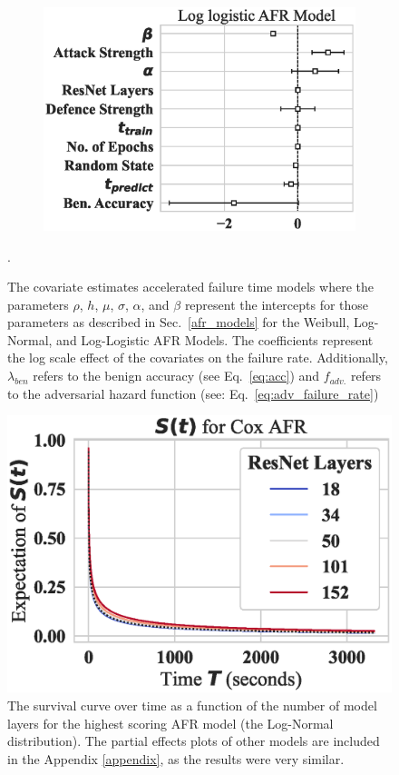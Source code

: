 \begin{figure}
\begin{subfigure}{0.32\textwidth}
        \includegraphics[width=\textwidth]{cifar100/log_logistic_aft.eps}
    \end{subfigure}
    
    \caption{The covariate estimates accelerated failure time models where the parameters $\rho$, $h$, $\mu$, $\sigma$, $\alpha$, and $\beta$ represent the intercepts for those parameters as described in Sec.~\ref{afr_models} for the Weibull, Log-Normal, and Log-Logistic AFR Models. The coefficients represent the log scale effect of the covariates on the failure rate. Additionally, $\lambda_{ben}$ refers to the benign accuracy (see Eq.~\ref{eq:acc}) and $f_{adv.}$ refers to the adversarial hazard function (see: Eq.~\ref{eq:adv_failure_rate})}.
    \label{fig:afr_models}
\end{figure}

% 
\begin{figure}
    \centering\includegraphics[width=.5\textwidth]{cifar100/log_normal_layers_partial_effect.eps}
   \caption{The survival curve over time as a function of the number of model layers for the highest scoring AFR model (the Log-Normal distribution). The partial effects plots of other models are included in the Appendix \ref{appendix}, as the results were very similar.}
    \label{fig:layers}
\end{figure}
% 


